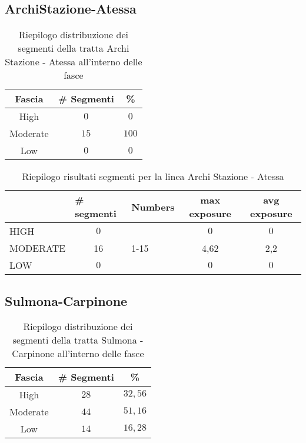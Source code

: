 \subsection{ArchiStazione-Atessa}
\label{app:archiatessa}
\begin{table}[hpt]
\centering
\begin{tabular}{|c|c|c|}
\hline \rowcolor{lightgray}
Fascia   & \# Segmenti & \%    \\ \hline \rowcolor{flamingopink}
High     & $0$           & $0$     \\ \hline \rowcolor{icterine}
Moderate & $15$          & $100$ \\ \hline \rowcolor{inchworm}
Low      & $0$          & $0$ \\ \hline
\end{tabular}
\caption{Riepilogo distribuzione dei segmenti della tratta Archi Stazione - Atessa all’interno delle fasce}
\end{table} 

\begin{table}[hpt]
	\centering
	\begin{tabular}{|l|c|l|c|c|}
		\hline \rowcolor{lightgray}
		& \multicolumn{1}{l|}{\# segmenti} & Numbers & max exposure & avg exposure \\ 
		\hline \rowcolor{flamingopink}
		HIGH     & $0$                                       &         & $0$            & $0$            \\ 
		\hline \rowcolor{icterine}
		MODERATE & 16                                      & 1-15    & 4,62  & 2,2  \\ 
		\hline \rowcolor{inchworm}
		LOW      & $0$                                       &         & $0$            & $0$            \\ 
		\hline
	\end{tabular}
	\caption{Riepilogo risultati segmenti per la linea Archi Stazione - Atessa}
\end{table}
\newpage
\subsection{Sulmona-Carpinone}
\label{app:sulmonacarpinone}
\begin{table}[hpt]
\centering
\begin{tabular}{|c|c|c|}
\hline \rowcolor{lightgray}
Fascia   & \# Segmenti & \%    \\ \hline \rowcolor{flamingopink}
High     & $28$           & $32,56$     \\ \hline \rowcolor{icterine}
Moderate & $44$          & $51,16$ \\ \hline \rowcolor{inchworm}
Low      & $14$          & $16,28$ \\ \hline
\end{tabular}
\caption{Riepilogo distribuzione dei segmenti della tratta Sulmona - Carpinone all’interno delle fasce}
\end{table} 

